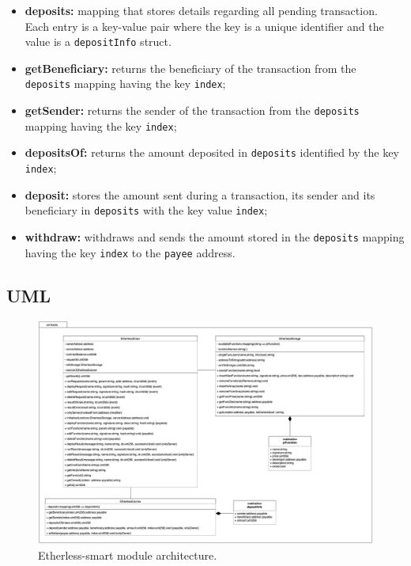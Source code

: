 	\begin{itemize}
		\item \textbf{deposits:} mapping that stores details regarding all pending transaction. Each entry is a key-value pair where the key is a unique identifier and the value is a \texttt{depositInfo} struct.	
		\end{itemize}
	\begin{itemize}
		\item \textbf{getBeneficiary:} returns the beneficiary of the transaction from the \texttt{deposits} mapping having the key \texttt{index};
		\item \textbf{getSender:} returns the sender of the transaction from the \texttt{deposits} mapping having the key \texttt{index};
		\item \textbf{depositsOf:} returns the amount deposited in \texttt{deposits} identified by the key \texttt{index};
		\item \textbf{deposit:} stores the amount sent during a transaction, its sender and its beneficiary in \texttt{deposits} with the key value \texttt{index};
		\item \textbf{withdraw:} withdraws and sends the amount stored in the \texttt{deposits} mapping having the key \texttt{index} to the \texttt{payee} address.
	\end{itemize}

	\begin{landscape}
	\subsection{UML}
		\begin{figure}[H]
			\includegraphics[width=21cm]{./diagrammi/etherless-smart/Etherless-smart.jpg}
			\caption{Etherless-smart module architecture.}
		\end{figure}
	\end{landscape}
	\restoregeometry

